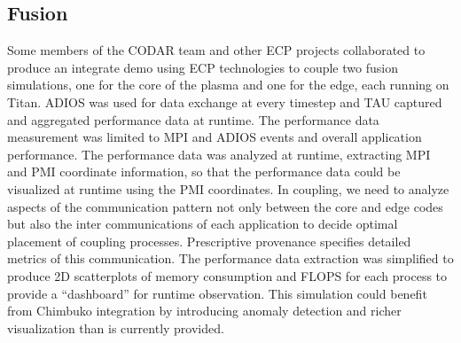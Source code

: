 \subsection{Fusion}
Some members of the CODAR team and other ECP projects collaborated to produce an integrate demo using ECP technologies to couple two fusion simulations, one for the core of the plasma and one for the edge, each running on Titan.  ADIOS was used for data exchange at every timestep and TAU captured and aggregated performance data at runtime. The performance data measurement was limited to MPI and ADIOS events and overall application performance.  The performance data was analyzed at runtime, extracting MPI and PMI coordinate information, so that the performance data could be visualized at runtime using the PMI coordinates.  In coupling, we need to analyze aspects of the communication pattern not only between the core and edge codes but also the inter communications of each application to decide optimal placement of coupling processes.  Prescriptive provenance specifies detailed metrics of this communication. 
The performance data extraction was simplified to produce 2D scatterplots of memory consumption and FLOPS for each process to provide a ``dashboard'' for runtime observation.  This simulation could benefit from Chimbuko integration by introducing anomaly detection and richer visualization than is currently provided. 

